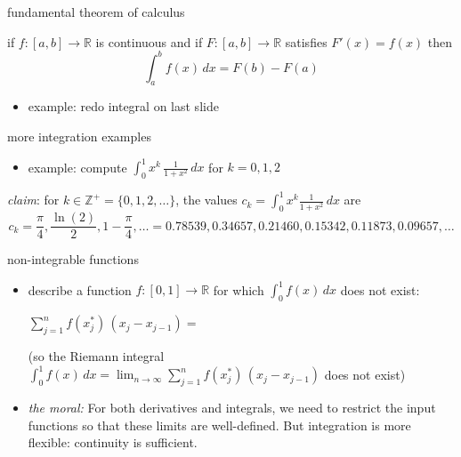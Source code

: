 \documentclass[10pt,
               svgnames,
               hyperref={colorlinks,citecolor=DeepPink4,linkcolor=FireBrick,urlcolor=Maroon},
               usepdftitle=false]{beamer}
\newcommand{\RR}{\mathbb{R}}
\newcommand{\ZZ}{\mathbb{Z}}
\newcommand{\ds}{\displaystyle}
\begin{document}
\begin{frame}{fundamental theorem of calculus}

\begin{theorem}
if $f:[a,b] \to \RR$ is continuous and if $F:[a,b]\to \RR$ satisfies $F'(x)=f(x)$ then
    $$\int_a^b f(x)\, dx = F(b) - F(a)$$
\end{theorem}

\begin{itemize}
\item example: redo integral on last slide

\vspace{30mm}
\end{itemize}

\end{frame}


\begin{frame}{more integration examples}

\begin{itemize}
\item example: compute $\displaystyle \int_0^1 x^k \,\frac{1}{1+x^2}\,dx$ for $k=0,1,2$

\vspace{60mm}
\end{itemize}

\noindent \hrulefill

{\footnotesize
\emph{claim}: for $k\in \ZZ^+=\{0,1,2,\dots\}$, the values $c_k = \int_0^1 x^k \frac{1}{1+x^2}\,dx$ are
    $$c_k = \frac{\pi}{4}, \frac{\ln(2)}{2}, 1 - \frac{\pi}{4}, \dots = 0.78539, 0.34657, 0.21460, 0.15342, 0.11873, 0.09657, \dots$$
}
\end{frame}


\begin{frame}{non-integrable functions}

\begin{itemize}
\item describe a function $f:[0,1]\to \RR$ for which $\int_0^1 f(x)\,dx$ does not exist:

\vspace{35mm}
$\ds \sum_{j=1}^n f(x_j^*)\,(x_j - x_{j-1}) = $ \hfill

\bigskip
(so the Riemann integral $\int_0^1 f(x)\,dx = \lim_{n\to\infty} \sum_{j=1}^n f(x_j^*)\,(x_j - x_{j-1})$ does not exist)
\bigskip

\item \emph{the moral:}  For both derivatives and integrals, we need to restrict the input functions so that these limits are well-defined.  But integration is more flexible: continuity is sufficient.
\end{itemize}
\end{frame}
\end{document}
